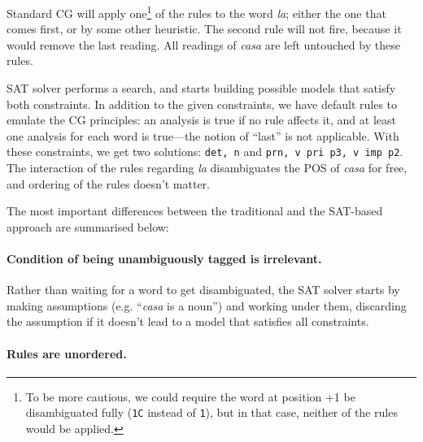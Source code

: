 \documentclass[11pt]{article}
\begin{document}
Standard CG will apply one\footnote{To be more cautious, we could require the word at position +1 be disambiguated fully (\texttt{1C} instead of \texttt{1}), but in that case, 
neither of the rules would be applied.} of the rules to the word \emph{la}; 
either the one that comes first, or by some other heuristic. 
The second rule will not fire, because it would remove the last reading. 
All readings of \emph{casa} are left untouched by these rules.

SAT solver 
performs a search, 
and starts building possible models that satisfy both constraints. 
In addition to the given constraints, we have default rules to emulate
the CG principles: an analysis is true if no rule affects it,
and at least one analysis for each word is true---the notion of ``last'' is not applicable.
With these constraints, we get two solutions: \texttt{det, n} and \texttt{prn, v pri p3, v imp p2}. 
The interaction of the rules regarding \emph{la}  disambiguates the POS of \emph{casa} 
for free, and ordering of the rules doesn't matter. 


The most important differences between the traditional and the SAT-based approach are summarised below:

\paragraph{Condition of being unambiguously tagged is irrelevant.}
Rather than waiting for a word to get disambiguated, the SAT solver starts by 
making assumptions (e.g. ``\emph{casa} is a noun'') and working under them,
discarding the assumption if it doesn't lead to a model that satisfies all constraints.

\paragraph{Rules are unordered.}
\end{document}
